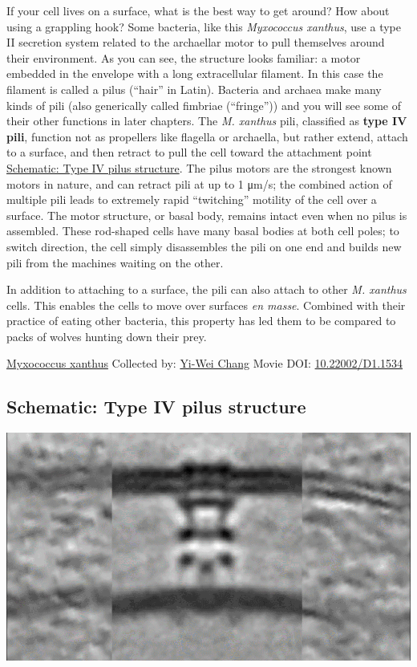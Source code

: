 \documentclass[]{tufte-book}
\begin{document}
If your cell lives on a surface, what is the best way to get around? How about using a grappling hook? Some bacteria, like this \emph{Myxococcus xanthus}, use a type II secretion system related to the archaellar motor to pull themselves around their environment. As you can see, the structure looks familiar: a motor embedded in the envelope with a long extracellular filament. In this case the filament is called a pilus (``hair'' in Latin). Bacteria and archaea make many kinds of pili (also generically called fimbriae (``fringe'')) and you will see some of their other functions in later chapters. The \emph{M. xanthus} pili, classified as \textbf{type IV pili}, function not as propellers like flagella or archaella, but rather extend, attach to a surface, and then retract to pull the cell toward the attachment point \protect\hyperlink{Type_IV_pilus_structure}{Schematic: Type IV pilus structure}. The pilus motors are the strongest known motors in nature, and can retract pili at up to 1 μm/s; the combined action of multiple pili leads to extremely rapid ``twitching'' motility of the cell over a surface. The motor structure, or basal body, remains intact even when no pilus is assembled. These rod-shaped cells have many basal bodies at both cell poles; to switch direction, the cell simply disassembles the pili on one end and builds new pili from the machines waiting on the other.

In addition to attaching to a surface, the pili can also attach to other \emph{M. xanthus} cells. This enables the cells to move over surfaces \emph{en masse}. Combined with their practice of eating other bacteria, this property has led them to be compared to packs of wolves hunting down their prey.



\hypertarget{htmlwidget-e668542a6b8627c45ec6}{}

\label{fig:6-10}\protect\hyperlink{tree}{Myxococcus xanthus} Collected by: \protect\hyperlink{yi-wei_chang}{Yi-Wei Chang} Movie DOI: \href{https://doi.org/10.22002/D1.1534}{10.22002/D1.1534}

\hypertarget{Type_IV_pilus_structure}{%
\subsection*{Schematic: Type IV pilus structure}\label{Type_IV_pilus_structure}}

\includegraphics{img/schematics/6_10_1}
\end{document}
